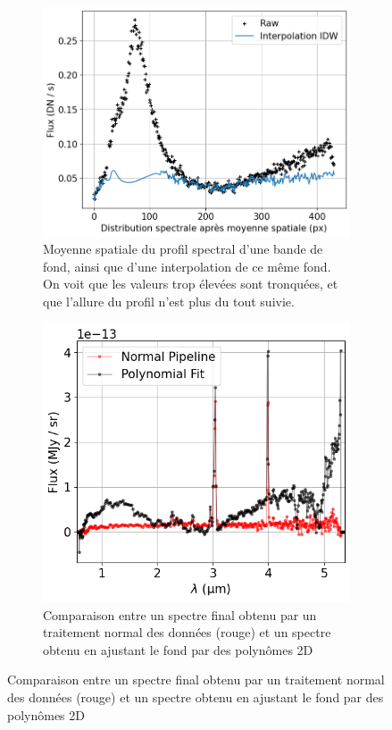 \documentclass[12pt, a4paper]{article}
\begin{document}
\begin{figure}[!h]
  \centering
     \begin{subfigure}[t]{0.45\textwidth}
        \centering
        \includegraphics[scale=0.45]{assets/idw_interpolation.png}
        \caption{Moyenne spatiale du profil spectral d'une bande de fond, ainsi que d'une interpolation de ce même fond. On voit que les valeurs trop élevées sont tronquées, et que l'allure du profil n'est plus du tout suivie.}
        \label{fig:interpolation}
     \end{subfigure}
     \hfill
     \begin{subfigure}[t]{0.45\textwidth}
        \centering
        \includegraphics[scale=0.57]{assets/comparaison_normal_fit.png}
        \caption{Comparaison entre un spectre final obtenu par un traitement normal des données (rouge) et un spectre obtenu en ajustant le fond par des polynômes 2D}
        \label{fig:comparaison_fit_normal}
     \end{subfigure}
\end{figure}
\end{document}
